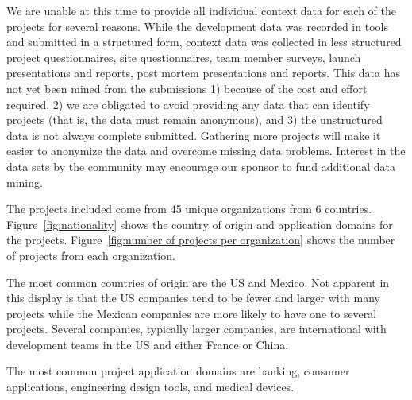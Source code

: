 \documentclass[smallcondensed]{svjour3}
\newcommand{\fig}[1]{Figure~\ref{fig:#1}}
\begin{document}
We are unable at this time to provide all individual context data for each of the projects for several reasons. While the development data was recorded in tools and submitted in a structured form, context data was collected in less structured project questionnaires, site questionnaires, team member surveys, launch presentations and reports, post mortem presentations and reports. This data has not yet been mined from the submissions 1) because of the cost and effort required, 2) we are obligated to avoid providing any data that can identify projects (that is, the data must remain anonymous), and 3) the unstructured data is not always  complete  submitted.   Gathering more projects will make it easier to anonymize the data and overcome missing data problems. Interest in the data sets by the community may encourage our sponsor to fund additional data mining. 

 
 The projects included come from 45 unique organizations from 6 countries. \fig{nationality} shows the country of origin and application domains for the projects.  \fig{number of projects per organization} shows the number of projects from each organization. 
 
The most common countries of origin are the US and Mexico. Not apparent in this display is that the US companies tend to be fewer and larger with many projects while the Mexican companies are more likely to have one to several projects. Several companies, typically larger companies, are international with development teams in the US and either France or China. 

The most common project application domains are banking, consumer applications, engineering design tools, and medical devices. 
 
\end{document}
